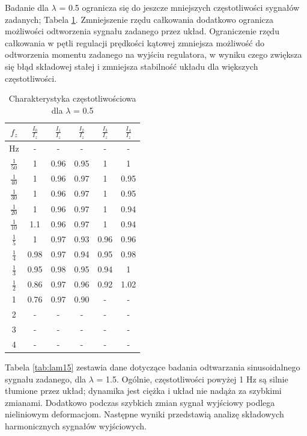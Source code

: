 \documentclass[journal,twoside,web]{ieeecolor}
\begin{document}
Badanie dla $\lambda$ = 0.5 ogranicza się do jeszcze mniejszych częstotliwości sygnałów zadanych; Tabela \ref{tab:lam05}. Zmniejszenie rzędu całkowania dodatkowo ogranicza możliwości odtworzenia sygnału zadanego przez układ. Ograniczenie rzędu całkowania w pętli regulacji prędkości kątowej zmniejsza możliwość do odtworzenia momentu zadanego na wyjściu regulatora, w wyniku czego zwiększa się błąd składowej stałej i zmniejsza stabilność układu dla większych częstotliwości.  
\begin{table}[h]
	\centering
	\caption{Charakterystyka częstotliwościowa dla $\lambda$ = 0.5}
	\label{tab:lam05} %
	\begin{tabular}{|c|c|c|c|c|c|}
		\hline
		$f_z$ & $\frac{I_{0}}{I_z}$ & $\frac{I_{1}}{I_z}$ & $\frac{I_{2}}{I_z}$ & $\frac{I_{3}}{I_z}$ & $\frac{I_{4}}{I_z}$ \\
		\hline
		Hz & - & - & - & - & - \\
		\hline
		$\frac{1}{50}$ & 1 & 0.96 & 0.95 & 1 & 1 \\
		\hline
		$\frac{1}{40}$ & 1 & 0.96 & 0.97 & 1 & 0.95 \\
		\hline
		$\frac{1}{30}$ & 1 & 0.96 & 0.97 & 1 & 0.95 \\
		\hline
		$\frac{1}{20}$ & 1 & 0.96 & 0.97 & 1 & 0.94 \\
		\hline
		$\frac{1}{10}$ & 1.1 & 0.96 & 0.97 & 1 & 0.94 \\
		\hline
		$\frac{1}{5}$ & 1 & 0.97 & 0.93 & 0.96 & 0.96 \\
		\hline
		$\frac{1}{4}$ & 0.98 & 0.97 & 0.94 & 0.95 & 0.98 \\
		\hline
		$\frac{1}{3}$ & 0.95 & 0.98 & 0.95 & 0.94 &1 \\
		\hline
		$\frac{1}{2}$ & 0.86 & 0.97 & 0.96 & 0.92 & 1.02 \\
		\hline
		1 & 			0.76 & 0.97 & 0.90 & - & - \\
		\hline
		2 & 			- 	 & -    & - & - & - \\
		\hline
		3 & 			-	 & -    & - & - & - \\
		\hline
		4 & - & - & - & - & - \\
		\hline
	\end{tabular}
\end{table}
Tabela \ref{tab:lam15} zestawia dane dotyczące badania odtwarzania sinusoidalnego sygnału zadanego, dla $\lambda$ = 1.5. Ogólnie, częstotliwości powyżej 1 Hz są silnie tłumione przez układ; dynamika jest ciężka i układ nie nadąża za szybkimi zmianami. Dodatkowo podczas szybkich zmian sygnał wyjściowy podlega nieliniowym deformacjom. Następne wyniki przedstawią analizę składowych harmonicznych sygnałów wyjściowych.
\end{document}
